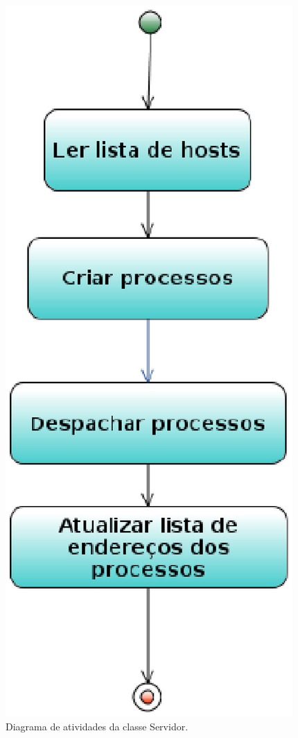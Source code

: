 \begin{figure}[htb]
  \centering
  \centerline{\includegraphics[scale=0.6]{imagens/diagrama_servidor.eps}}
  \caption{ Diagrama de atividades da classe Servidor.}
\label{fig:diagrama_servidor}
\end{figure}

